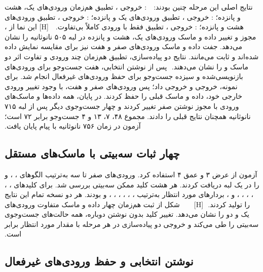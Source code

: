 ‫
‫نتایج اصلی این مرحله چنین بودند:
‫
‫
‫ : خروجی ، تطبیق هم‌زمان ورودی‌های یک، هشت و پانزده؛
‫ : خروجی ، تطبیق ورودی‌های یک و پانزده؛
‫ : خروجی ، تطبیق ورودی‌های هشت و پانزده؛
‫ : خروجی ، تطبیق فقط با ورودی کاملاً بی‌تفاوت.
‫
‫
‫[H]
‫
‫
‫
‫
‫
‫این نما از ، مجوز  و تغییر داده و ماسک ورودی‌های یک، هشت و پانزده در لبه ۵۰۵ نانوثانیه را نشان می‌دهد. جفت داده و ماسک ورودی‌های صفر و هفت نیز برای مقایسه نمایش داده شده‌اند و ثابت می‌مانند. نتایج دو پیاده‌سازی، تطبیق هم‌زمان چند ورودی و تفاوت اثر دو ماسک  و  را نشان می‌دهند.
‫
‫پس از نوشتن انتخابی، هفت جست‌وجو برای ورودی‌های بازنویسی‌شده و سیزده جست‌وجو برای حفظ ورودی‌های غیرفعال انجام شد. برای نمونه،  خروجی  و  خروجی  داد؛ پس ورودی‌های صفر و هفت، با وجود تغییر ورودی خارجی خود، داده و ماسک قبلی را حفظ کردند. در پایان، همه داده‌ها و ماسک‌های ورودی با مجوز نوشتن صفر تغییر کردند و چهار جست‌وجوی دیگر پس از لبه ۷۱۵ نانوثانیه همچنان نتایج قبلی را دادند. مجموع ۴۸، ۷، ۱۳ و ۴ جست‌وجو برابر ۷۲ است؛ آزمون در زمان ۷۵۶ نانوثانیه با پیام  پایان یافت.
‫
‫\subsection{چهار ثبات سه‌بیتی با ماسک‌های مستقل}
‫
‫آزمون  از عرض ۳ و عمق ۴ استفاده کرد. ورودی‌های صفر تا سه به‌ترتیب الگوهای ، ،  و  را در یک لبه دریافت کردند. هر هشت کلید ممکن سه‌بیتی بررسی شد. برای کلیدهای ، ، ، ، ، ،  و ، بردارهای مورد انتظار به‌ترتیب ، ، ، ، ، ،  و  بودند. هر دو نسخه تمام این نتایج را تولید کردند.
‫
‫[H]
‫
‫
‫
‫
‫
‫شکل از  ثبت هم‌زمان چهار داده و ماسک متفاوت ورودی‌های یک و دو را نشان می‌دهد. تغییر کلید بدون نوشتن دوباره، همه حالت‌های جست‌وجوی سه‌بیتی را طی می‌کند و خروجی دو پیاده‌سازی در هر مرحله با مقدار مورد انتظار برابر است.
‫
‫\subsection{نوشتن انتخابی و حفظ ورودی‌های غیرفعال}
